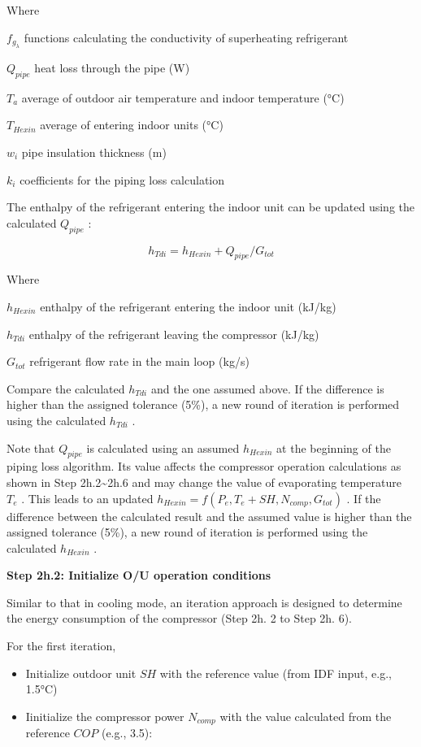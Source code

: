 Where

\(f_{g_\lambda}\) functions calculating the conductivity of superheating refrigerant

\(Q_{pipe}\) heat loss through the pipe (W)

\(T_a\) average of outdoor air temperature and indoor temperature (°C)

\(T_{Hexin}\) average of entering indoor units (°C)

\(w_i\) pipe insulation thickness (m)

\(k_i\) coefficients for the piping loss calculation

The enthalpy of the refrigerant entering the indoor unit can be updated using the calculated \(Q_{pipe}\) :

\begin{equation}
h_{Tdi} = h_{Hexin}+Q_{pipe}/G_{tot}
\end{equation}

Where

\(h_{Hexin}\) enthalpy of the refrigerant entering the indoor unit (kJ/kg)

\(h_{Tdi}\) enthalpy of the refrigerant leaving the compressor (kJ/kg)

\(G_{tot}\) refrigerant flow rate in the main loop (kg/s)

Compare the calculated \(h_{Tdi}\) and the one assumed above. If the difference is higher than the assigned tolerance (5\%), a new round of iteration is performed using the calculated \(h_{Tdi}\) .

Note that \(Q_{pipe}\) is calculated using an assumed \(h_{Hexin}\) at the beginning of the piping loss algorithm. Its value affects the compressor operation calculations as shown in Step 2h.2\textasciitilde{}2h.6 and may change the value of evaporating temperature \(T_e\) . This leads to an updated \(h_{Hexin} = f(P_e,T_e+SH,N_{comp},G_{tot})\) . If the difference between the calculated result and the assumed value is higher than the assigned tolerance (5\%), a new round of iteration is performed using the calculated \(h_{Hexin}\) .

\textbf{Step 2h.2: Initialize O/U operation conditions}

Similar to that in cooling mode, an iteration approach is designed to determine the energy consumption of the compressor (Step 2h. 2 to Step 2h. 6).

For the first iteration,

\begin{itemize}
\item
  Initialize outdoor unit \(SH\) with the reference value (from IDF input, e.g., 1.5°C)
\item
  Iinitialize the compressor power \(N_{comp}\) with the value calculated from the reference \(COP\) (e.g., 3.5):
\end{itemize}

